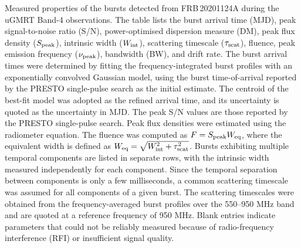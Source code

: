 \vspace{-0.2cm}
{\footnotesize

Measured properties of the bursts detected from FRB\,20201124A during the uGMRT Band-4 observations. The table lists the burst arrival time (MJD), peak signal-to-noise ratio (S/N), power-optimised dispersion measure (DM), peak flux density ($S_{\rm peak}$), intrinsic width ($W_{\rm int}$), scattering timescale {($\tau_{\rm scat}$)}, fluence, peak emission frequency ($\nu_{\rm peak}$), bandwidth (BW), and drift rate. The burst arrival times were determined by fitting the frequency-integrated burst profiles with an exponentially convolved Gaussian model, using the burst time-of-arrival reported by the PRESTO single-pulse search as the initial estimate. The centroid of the best-fit model was adopted as the refined arrival time, and its uncertainty is quoted as the uncertainty in MJD. The peak S/N values are those reported by the PRESTO single-pulse search. Peak flux densities were estimated using the radiometer equation. The fluence was computed as $F = S_{\rm peak}W_{\rm eq}$, where the equivalent width is defined as $W_{\rm eq}=\sqrt{W_{\rm int}^{2}+ \tau_{\rm scat}^{2}}$. Bursts exhibiting multiple temporal components are listed in separate rows, with the intrinsic width measured independently for each component. Since the temporal separation between components is only a few milliseconds, a common scattering timescale was assumed for all components of a given burst. The scattering timescales were obtained from the frequency-averaged burst profiles over the 550--950 MHz band and are quoted at a reference frequency of 950 MHz. Blank entries indicate parameters that could not be reliably measured because of radio-frequency interference (RFI) or insufficient signal quality.}



